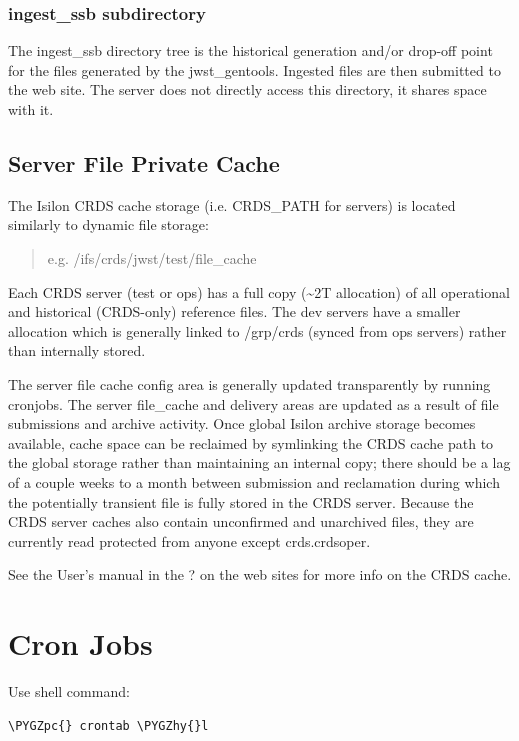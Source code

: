 \documentclass[letterpaper,10pt,english]{sphinxmanual}
\def\PYGZpc{\char`\%}
\def\PYGZhy{\char`\-}
\begin{document}
\subsection{ingest\_ssb subdirectory}
\label{server_guide:ingest-ssb-subdirectory}
The ingest\_ssb directory tree is the historical generation and/or drop-off point for the files generated by the
jwst\_gentools.   Ingested files are then submitted to the web site.   The server does not directly access this
directory,  it shares space with it.


\section{Server File Private Cache}
\label{server_guide:server-file-private-cache}
The Isilon CRDS cache storage (i.e. CRDS\_PATH for servers) is located similarly to dynamic file storage:
\begin{quote}

e.g. /ifs/crds/jwst/test/file\_cache
\end{quote}

Each CRDS server (test or ops) has a full copy (\textasciitilde{}2T allocation) of all operational and historical (CRDS-only)
reference files. The dev servers have a smaller allocation which is generally linked to /grp/crds
(synced from ops servers) rather than internally stored.

The server file cache config area is generally updated transparently by running cronjobs.   The server file\_cache
and delivery areas are updated as a result of file submissions and archive activity.  Once global Isilon archive storage
becomes available, cache space can be reclaimed by symlinking the CRDS cache path to the global storage rather than
maintaining an internal copy;  there should be a lag of a couple weeks to a month between submission and reclamation
during which the potentially transient file is fully stored in the CRDS server.   Because the CRDS server caches also
contain unconfirmed and unarchived files,  they are currently read protected from anyone except crds.crdsoper.

See the User's manual in the ? on the web sites for more info on the CRDS cache.


\chapter{Cron Jobs}
\label{server_guide:cron-jobs}
Use shell command:

\begin{Verbatim}[commandchars=\\\{\}]
\PYGZpc{} crontab \PYGZhy{}l
\end{Verbatim}
\end{document}
